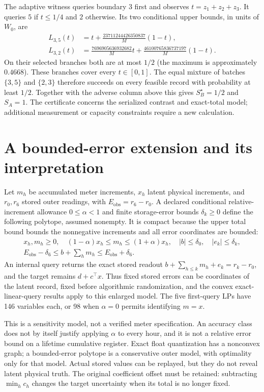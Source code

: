 The adaptive witness queries boundary $3$ first and observes
$t=z_1+z_2+z_3$. It queries $5$ if $t\leq1/4$ and $2$ otherwise.
Its two conditional upper bounds, in units of $W_0$, are
\[
 \begin{aligned}
 L_{3,5}(t)&=t+\frac{23711244426350837}{M}(1-t),\\
 L_{3,2}(t)&=\frac{7696905636932682}{M}t+
                    \frac{46100765836737197}{M}(1-t).
 \end{aligned}
\]
On their selected branches both are at most $1/2$ (the maximum is
approximately $0.4668$). These branches cover every $t\in[0,1]$.
The equal mixture of batches $\{3,5\}$ and $\{2,3\}$ therefore succeeds
on every feasible record with probability at least $1/2$. Together with
the adverse column above this gives $S_B^\star=1/2$ and $S_A=1$.
The certificate concerns the serialized contrast and exact-total model;
additional measurement or capacity constraints require a new calculation.

\section{A bounded-error extension and its interpretation}\label{app:stored-error}
Let $m_h$ be accumulated meter increments, $x_h$ latent physical increments,
and $r_0,r_6$ stored outer readings, with $E_{\mathrm{obs}}=r_6-r_0$.
A declared conditional relative-increment allowance $0\leq\alpha<1$ and
finite storage-error bounds $\delta_k\geq0$ define the following
polytope, assumed nonempty. It is compact because the upper total bound
bounds the nonnegative increments and all error coordinates are bounded:
\[
\begin{gathered}
 x_h,m_h\geq0,\quad(1-\alpha)x_h\leq m_h\leq(1+\alpha)x_h,\quad
 |b|\leq\delta_0,\quad |e_k|\leq\delta_k,\\
 E_{\mathrm{obs}}-\delta_6\leq b+\sum_hm_h\leq E_{\mathrm{obs}}+\delta_6.
\end{gathered}
\]
An internal query returns the exact stored readout
$b+\sum_{h\leq k}m_h+e_k=r_k-r_0$, and the target remains $d+c^\top x$.
Thus fixed stored errors can be coordinates of the latent record, fixed
before algorithmic randomization, and the convex exact-linear-query
results apply to this enlarged model. The five first-query LPs have
146 variables each, or 98 when $\alpha=0$ permits identifying $m=x$.

This is a sensitivity model, not a verified meter specification.
An accuracy class does not by itself justify applying $\alpha$ to every
hour, and it is not a relative error bound on a lifetime cumulative register.
Exact float quantization has a nonconvex graph; a bounded-error polytope
is a conservative outer model, with optimality only for that model.
Actual stored values can be replayed, but they do not reveal latent
physical truth. The original coefficient offset must be retained:
subtracting $\min_hc_h$ changes the target uncertainty when its total
is no longer fixed.

